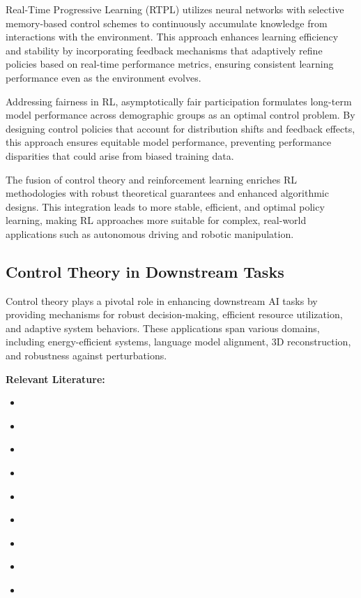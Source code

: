 \documentclass{article}
\theoremstyle{plain}
\theoremstyle{definition}
\theoremstyle{remark}
\begin{document}
Real-Time Progressive Learning (RTPL) \cite{feiRealtimeProgressiveLearning2023} utilizes neural networks with selective memory-based control schemes to continuously accumulate knowledge from interactions with the environment. This approach enhances learning efficiency and stability by incorporating feedback mechanisms that adaptively refine policies based on real-time performance metrics, ensuring consistent learning performance even as the environment evolves.

Addressing fairness in RL, asymptotically fair participation \cite{chenAsymptoticallyFairParticipation2023} formulates long-term model performance across demographic groups as an optimal control problem. By designing control policies that account for distribution shifts and feedback effects, this approach ensures equitable model performance, preventing performance disparities that could arise from biased training data.

The fusion of control theory and reinforcement learning enriches RL methodologies with robust theoretical guarantees and enhanced algorithmic designs. This integration leads to more stable, efficient, and optimal policy learning, making RL approaches more suitable for complex, real-world applications such as autonomous driving and robotic manipulation.

\subsection{Control Theory in Downstream Tasks}

Control theory plays a pivotal role in enhancing downstream AI tasks by providing mechanisms for robust decision-making, efficient resource utilization, and adaptive system behaviors. These applications span various domains, including energy-efficient systems, language model alignment, 3D reconstruction, and robustness against perturbations.

\textbf{Relevant Literature:}
\begin{itemize}
    \item \cite{ahmadvandCloudedgeFrameworkEnergyefficient2024}
    \item \cite{kongAligningLargeLanguage2024}
    \item \cite{hanUtilityKoopmanOperator2023}
    \item \cite{chengLinearlyControlledLanguage2024}
    \item \cite{chenPIDControlbasedSelfhealing2024}
    \item \cite{chenSelfhealingRobustNeural2022}
    \item \cite{chenTransferLearningbasedPhysicsinformed2023}
    \item \cite{chenRobustNeuralNetworks2021}
    \item \cite{soattoTamingAIBots2023}
\end{itemize}
\end{document}
